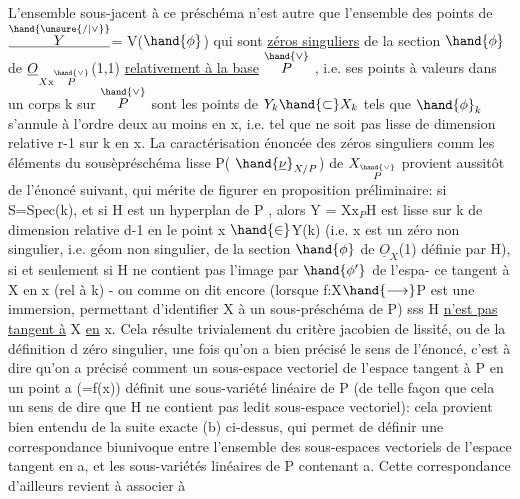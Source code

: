 
\margin{$|$}L'ensemble sous-jacent à ce préschéma n'est autre que l'ensemble des
points de $\underline{\overset{\hand{\unsure{/|\vee}}}{Y}}$= V($\hand{\phi}$) qui sont \uline{zéros singuliers} de la section $\hand{\phi}$ de
$\underline{O}_{X\mathrm{x}\overset{\hand{\vee}}{P}}$(1,1) \uline{relativement à la base} $\overset{\hand{\vee}}{P}$ , i.e. ses points  à valeurs dans
un corps k sur $\overset{\hand{\vee}}{P}$ sont les points  de $Y_k\hand{\subset} X_k$ tels que 
 $\hand{\phi}_k$ s'annule à l'ordre deux au moins
en x, i.e. tel que  ne soit pas lisse de dimension relative r-1
sur k en x. La caractérisation énoncée des  zéros singuliers comm
les éléments du sousèpréschéma lisse P( $\hand{\underline{\nu}}_{X/P}$) de $X_{\overset{\hand{\vee}}{P}}$ provient aussitôt
de l'énoncé suivant, qui mérite de figurer en proposition préliminaire:
si S=Spec(k), et si H est un hyperplan de P , alors Y = X$\mathrm{x}_P$H est
 lisse sur k de
dimension relative d-1 en le point x $\hand{\in}$Y(k) (i.e. x est un zéro non
singulier, i.e. géom non singulier, de la section $\hand{\phi}$ de $\underline{O}_X$(1) définie
par H), si et seulement si H ne contient pas l'image par $\hand{\phi'}$ de l'espa-%
ce tangent à X en x (rel à k) - ou  comme on dit encore
(lorsque f:X$\hand{\longrightarrow}$P est une immersion, permettant d'identifier X à un
sous-préschéma de P) sss H \uline{n'est pas tangent à} X \uline{en} x. Cela résulte
trivialement du critère jacobien de lissité, ou de la définition d
zéro singulier, une fois qu'on a bien précisé le sens de l'énoncé,
c'est à dire qu'on a précisé comment un  sous-espace
\margin{$|$}vectoriel de l'espace tangent à P en un point a (=f(x)) définit une
sous-variété linéaire de P (de telle façon que cela  un sens de dire
que H ne contient pas ledit sous-espace vectoriel): cela provient
bien entendu de la suite exacte (b) ci-dessus, qui permet de
définir une correspondance biunivoque entre l'ensemble des sous-espaces
vectoriels de l'espace tangent en a, et les sous-variétés linéaires de
P contenant a. Cette correspondance d'ailleurs revient à associer à

